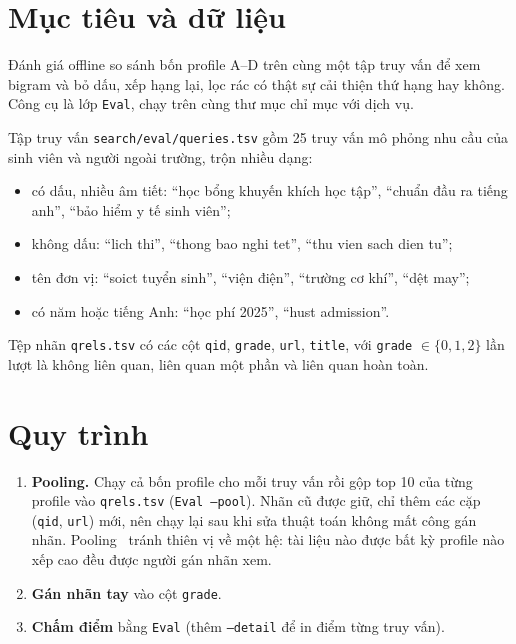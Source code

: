 \documentclass[12pt,a4paper]{report}
\begin{document}
\section{Mục tiêu và dữ liệu}

Đánh giá offline so sánh bốn profile A--D trên cùng một tập truy vấn để xem bigram và bỏ dấu, xếp hạng lại, lọc rác có
thật sự cải thiện thứ hạng hay không. Công cụ là lớp \texttt{Eval}, chạy trên cùng thư mục chỉ mục với dịch vụ.

Tập truy vấn \texttt{search/eval/queries.tsv} gồm 25 truy vấn mô phỏng nhu cầu của sinh viên và người ngoài trường, trộn
nhiều dạng:
\begin{itemize}
  \item có dấu, nhiều âm tiết: ``học bổng khuyến khích học tập'', ``chuẩn đầu ra tiếng anh'', ``bảo hiểm y tế sinh viên'';
  \item không dấu: ``lich thi'', ``thong bao nghi tet'', ``thu vien sach dien tu'';
  \item tên đơn vị: ``soict tuyển sinh'', ``viện điện'', ``trường cơ khí'', ``dệt may'';
  \item có năm hoặc tiếng Anh: ``học phí 2025'', ``hust admission''.
\end{itemize}

Tệp nhãn \texttt{qrels.tsv} có các cột \texttt{qid}, \texttt{grade}, \texttt{url}, \texttt{title}, với
\texttt{grade} $\in \{0, 1, 2\}$ lần lượt là không liên quan, liên quan một phần và liên quan hoàn toàn.

\section{Quy trình}

\begin{enumerate}
  \item \textbf{Pooling.} Chạy cả bốn profile cho mỗi truy vấn rồi gộp top 10 của từng profile vào \texttt{qrels.tsv}
        (\texttt{Eval --pool}). Nhãn cũ được giữ, chỉ thêm các cặp (\texttt{qid}, \texttt{url}) mới, nên chạy lại sau khi
        sửa thuật toán không mất công gán nhãn. Pooling~\cite{manning2008} tránh thiên vị về một hệ: tài liệu nào được bất kỳ profile nào
        xếp cao đều được người gán nhãn xem.
  \item \textbf{Gán nhãn tay} vào cột \texttt{grade}.
  \item \textbf{Chấm điểm} bằng \texttt{Eval} (thêm \texttt{--detail} để in điểm từng truy vấn).
\end{enumerate}
\end{document}
